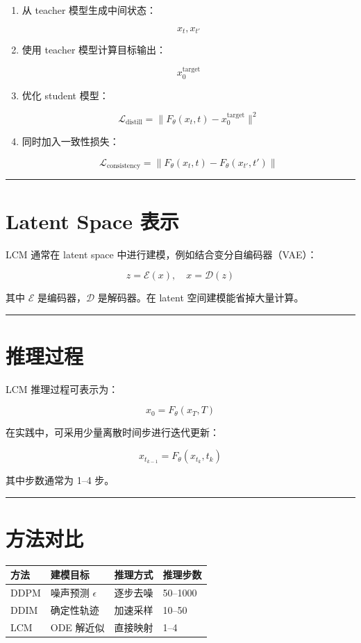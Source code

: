 \begin{enumerate}
  \item 从 teacher 模型生成中间状态：
  
  \[
  x_t, x_{t'}
  \]
  \item 使用 teacher 模型计算目标输出：
  
  \[
  x_0^{\text{target}}
  \]
  \item 优化 student 模型：
  
  \[
  \mathcal{L}_{\text{distill}} = \|F_\theta(x_t, t) - x_0^{\text{target}}\|^2
  \]
  \item 同时加入一致性损失：
  
  \[
  \mathcal{L}_{\text{consistency}} = \|F_\theta(x_t, t) - F_\theta(x_{t'}, t')\|
  \]
\end{enumerate}

\hrule

\section{Latent Space 表示}

LCM 通常在 latent space 中进行建模，例如结合变分自编码器（VAE）：

\[
z = \mathcal{E}(x), \quad x = \mathcal{D}(z)
\]

其中 \(\mathcal{E}\) 是编码器，\(\mathcal{D}\) 是解码器。在 latent 空间建模能省掉大量计算。

\hrule

\section{推理过程}

LCM 推理过程可表示为：

\[
x_0 = F_\theta(x_T, T)
\]

在实践中，可采用少量离散时间步进行迭代更新：

\[
x_{t_{k-1}} = F_\theta(x_{t_k}, t_k)
\]

其中步数通常为 1–4 步。

\hrule

\section{方法对比}

\begin{center}
\begin{tabular}{llll}
\toprule
方法 & 建模目标 & 推理方式 & 推理步数 \\
\midrule
DDPM & 噪声预测 \(\epsilon\) & 逐步去噪 & 50–1000 \\
DDIM & 确定性轨迹 & 加速采样 & 10–50 \\
LCM & ODE 解近似 & 直接映射 & 1–4 \\
\bottomrule
\end{tabular}
\end{center}

